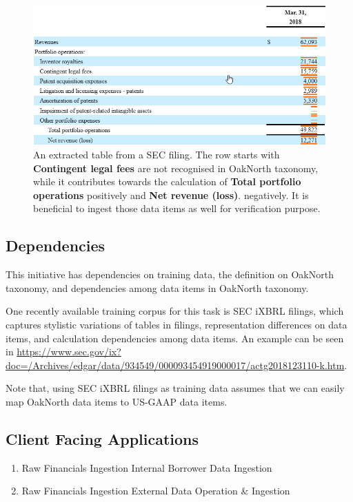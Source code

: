 \documentclass[]{article}
\begin{document}
\begin{figure}[h]
    \centering
    \includegraphics[width=.95\linewidth]{./tu_1.png}
    \caption{An extracted table from a SEC filing. The row starts with 
    \textbf{Contingent legal fees} are not recognised in OakNorth taxonomy, 
    while it contributes towards the calculation of \textbf{Total portfolio 
    operations} positively and \textbf{Net revenue (loss)}. 
    negatively. It is beneficial to ingest those data items as well for 
    verification purpose.\label{fig:tu_neighbour}}
\end{figure}

\subsection{Dependencies}
This initiative has dependencies on training data, the definition on OakNorth 
taxonomy, and dependencies among data items in OakNorth taxonomy. 

One recently available training corpus for this task is SEC iXBRL filings, 
which captures stylistic variations of tables in filings, representation 
differences on data items, and calculation dependencies among data items. An 
example can be 
seen in 
\url{https://www.sec.gov/ix?doc=/Archives/edgar/data/934549/000093454919000017/actg2018123110-k.htm}.

Note that, using SEC iXBRL filings as training data assumes that we can easily 
map OakNorth data items to US-GAAP data items. 

\subsection{Client Facing Applications}
\begin{enumerate}
    \item Raw Financials Ingestion \textrightarrow Internal Borrower Data 
    Ingestion
    \item  Raw Financials Ingestion \textrightarrow External Data Operation \& 
    Ingestion 
\end{enumerate}
\end{document}
